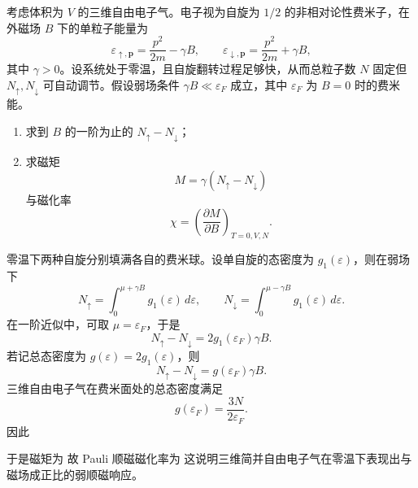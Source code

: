 \begin{question}
考虑体积为 $V$ 的三维自由电子气。电子视为自旋为 $1/2$ 的非相对论性费米子，在外磁场 $B$ 下的单粒子能量为
\[
\varepsilon_{\uparrow,\mathbf p}=\frac{p^2}{2m}-\gamma B,
\qquad
\varepsilon_{\downarrow,\mathbf p}=\frac{p^2}{2m}+\gamma B,
\]
其中 $\gamma>0$。设系统处于零温，且自旋翻转过程足够快，从而总粒子数 $N$ 固定但 $N_\uparrow,N_\downarrow$ 可自动调节。假设弱场条件 $\gamma B\ll \varepsilon_F$ 成立，其中 $\varepsilon_F$ 为 $B=0$ 时的费米能。

\begin{enumerate}[label=(\arabic*),leftmargin=2.5em]
  \item 求到 $B$ 的一阶为止的 $N_\uparrow-N_\downarrow$；
  \item 求磁矩
  \[
  M=\gamma(N_\uparrow-N_\downarrow)
  \]
  与磁化率
  \[
  \chi=\left(\frac{\partial M}{\partial B}\right)_{T=0,V,N}.
  \]
\end{enumerate}

\begin{solution}
零温下两种自旋分别填满各自的费米球。设单自旋的态密度为 $g_1(\varepsilon)$，则在弱场下
\[
N_\uparrow=\int_0^{\mu+\gamma B} g_1(\varepsilon)\,d\varepsilon,
\qquad
N_\downarrow=\int_0^{\mu-\gamma B} g_1(\varepsilon)\,d\varepsilon.
\]
在一阶近似中，可取 $\mu=\varepsilon_F$，于是
\[
N_\uparrow-N_\downarrow=2g_1(\varepsilon_F)\gamma B.
\]
若记总态密度为 $g(\varepsilon)=2g_1(\varepsilon)$，则
\[
N_\uparrow-N_\downarrow=g(\varepsilon_F)\gamma B.
\]
三维自由电子气在费米面处的总态密度满足
\[
g(\varepsilon_F)=\frac{3N}{2\varepsilon_F}.
\]
因此

于是磁矩为
故 Pauli 顺磁磁化率为
这说明三维简并自由电子气在零温下表现出与磁场成正比的弱顺磁响应。
\end{solution}
\end{question}

